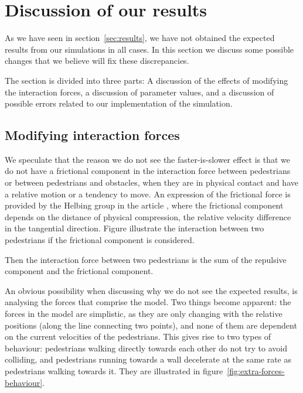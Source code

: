 \section{Discussion of our results}
\label{sec:discussion}
As we have seen in section~\ref{sec:results}, we have not obtained the 
expected results from our simulations in all cases. In this section we discuss 
some possible changes that we believe will fix these discrepancies.

The section is divided into three parts: A discussion of the effects of modifying  
the interaction forces, a discussion of parameter values, and a 
discussion of possible errors related to our implementation of the simulation.

\subsection{Modifying interaction forces}

We speculate that the reason we do not see the faster-is-slower effect is 
that we do not have a frictional component in the interaction force between pedestrians 
or between pedestrians and obstacles, when they are in physical contact and have a 
relative motion or a tendency to move. An expression of the frictional force is 
provided by the Helbing group in the article \cite{helbing00}, where the frictional component 
depends on the distance of physical compression, the relative velocity difference in 
the tangential direction. Figure  illustrate the interaction between two pedestrians 
if the frictional component is considered.


Then the interaction force between two pedestrians is the sum of the repulsive component 
and the frictional component.

An obvious possibility when discussing why we do not see the expected results, 
is analysing the forces that comprise the model. Two things become apparent: 
the forces in the model are simplistic, as they are only changing with the relative 
positions (along the line connecting two points), and none of them are dependent 
on the current velocities of the pedestrians. This gives rise to two types of 
behaviour: pedestrians walking directly towards each other do not try to avoid 
colliding, and pedestrians running towards a wall decelerate at the same rate 
as pedestrians walking towards it. They are illustrated in 
figure~\ref{fig:extra-forces-behaviour}.

